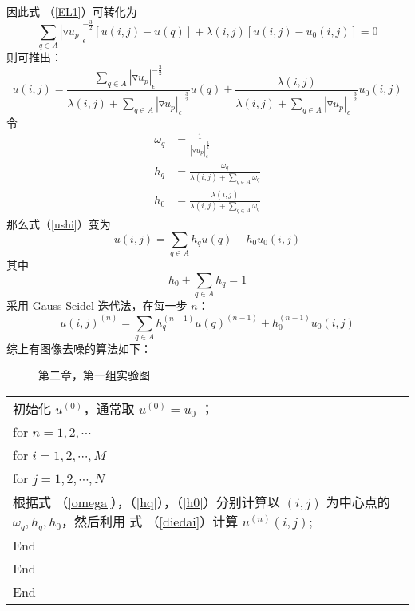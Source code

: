 因此式 （\ref{EL1}）可转化为
\begin{equation}
\sum_{q \in A} |\triangledown u_p|_\epsilon^{-\frac{3}{2}}[u(i,j)-u(q)]+\lambda (i,j)[u(i,j)-u_0(i,j)]=0
\end{equation}
则可推出：
\begin{equation}
\label{ushi}
u(i,j)=\frac{\sum_{q \in A} |\triangledown u_p|_\epsilon^{-\frac{3}{2}}}{\lambda (i,j)+\sum_{q \in A} |\triangledown u_p|_\epsilon^{-\frac{3}{2}}}u(q)+\frac{\lambda (i,j)}{\lambda (i,j)+\sum_{q \in A} |\triangledown u_p|_\epsilon^{-\frac{3}{2}}}u_0(i,j)
\end{equation}
令
\begin{align}
\label{omega}
\omega_q&=\frac{1}{|\triangledown u_p|_\epsilon^{\frac{3}{2}}} \\
\label{hq}
h_q&=\frac{\omega_q}{\lambda (i,j)+\sum_{q \in A} \omega _q} \\
\label{h0}
h_0&=\frac{\lambda (i,j)}{\lambda (i,j)+\sum_{q \in A} \omega _q}
\end{align}
那么式（\ref{ushi}）变为
\begin{equation}
u(i,j)=\sum_{q \in A}h_qu(q)+h_0u_0(i,j)
\end{equation}
其中
\begin{equation}
h_0+\sum_{q \in A}h_q=1
\end{equation}
采用 Gauss-Seidel 迭代法，在每一步 $n$：
\begin{equation}
\label{diedai}
u(i,j)^{(n)}=\sum_{q \in A}h_q^{(n-1)}u(q)^{(n-1)}+h_0^{(n-1)}u_0(i,j)
\end{equation}
综上有图像去噪的算法如下：
\begin{figure}[H]
\centering
\subfigure[$\lambda=\frac{1}{20^2}$]{\label{figure:1/20} \texttt{[image: 003]}}
\subfigure[$\lambda=\frac{5}{20^2}$]{\label{figure:5/20} \texttt{[image: 004]}}
\caption{第二章，第一组实验图}
\end{figure}
\begin{tabular}{|p{10cm}|}
\hline
初始化 $u^{(0)}$，通常取 $u^{(0)}=u_0$ ；\\
for $n=1,2,\cdots$  \\
 \quad for $i=1,2,\cdots,M$  \\
   \qquad for $j=1,2,\cdots,N$   \\
根据式 （\ref{omega}），（\ref{hq}），（\ref{h0}）分别计算以 $(i,j)$ 为中心点的 $\omega_q,h_q,h_0$，然后利用
式 （\ref{diedai}）计算 $u^{(n)}(i,j)$;\\
End \\
\quad End \\
    \qquad End \\
\hline
\end{tabular}
